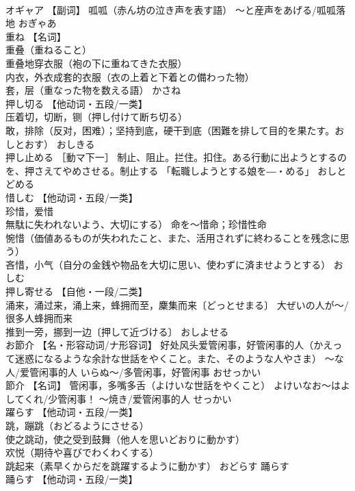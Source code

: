 \documentclass[8pt]{extreport}
\begin{document}
\begin{CJK}{UTF8}{min}
\\	オギャア	【副词】 呱呱（赤ん坊の泣き声を表す語） ～と産声をあげる/呱呱落地	おぎゃあ	
\\	重ね	【名词】 
\\	重叠（重ねること） 
\\	重叠地穿衣服（袍の下に重ねてきた衣服） 
\\	内衣，外衣成套的衣服（衣の上着と下着との備わった物） 
\\	套，层（重なった物を数える語）	かさね	
\\	押し切る	【他动词・五段/一类】 
\\	压着切，切断，铡（押し付けて断ち切る） 
\\	敢，排除（反对，困难）；坚持到底，硬干到底（困難を排して目的を果たす。おしとおす）	おしきる	
\\	押し止める	［動マ下一］ 制止、阻止。拦住。扣住。ある行動に出ようとするのを、押さえてやめさせる。制止する 「転職しようとする娘を―・める」	おしとどめる	
\\	惜しむ	【他动词・五段/一类】 
\\	珍惜，爱惜
\\	無駄に失われないよう、大切にする） 命を～惜命；珍惜性命 
\\	惋惜（価値あるものが失われたこと、また、活用されずに終わることを残念に思う） 
\\	吝惜，小气（自分の金銭や物品を大切に思い、使わずに済ませようとする）	おしむ	
\\	押し寄せる	【自他・一段/二类】 
\\	涌来，涌过来，涌上来，蜂拥而至，麇集而来〔どっとせまる〕 大ぜいの人が～/很多人蜂拥而来 
\\	推到一旁，挪到一边〔押して近づける〕	おしよせる	
\\	お節介	【名・形容动词/ナ形容词】 好处风头爱管闲事，好管闲事的人（かえって迷惑になるような余計な世話をやくこと。また、そのような人やさま） ～な人/爱管闲事的人 いらぬ～/多管闲事，好管闲事	おせっかい	
\\	節介	【名词】 管闲事，多嘴多舌（よけいな世話をやくこと） よけいなお～はよしてくれ/少管闲事！ ～焼き/爱管闲事的人	せっかい	
\\	躍らす	【他动词・五段/一类】 
\\	跳，蹦跳（おどるようにさせる） 
\\	使之跳动，使之受到鼓舞（他人を思いどおりに動かす） 
\\	欢悦（期待や喜びでわくわくする） 
\\	跳起来（素早くからだを跳躍するように動かす）	おどらす	踊らす
\\	踊らす	【他动词・五段/一类】 

\end{CJK}
\end{document}
